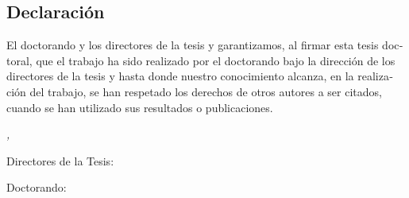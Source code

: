 \begin{otherlanguage}{spanish}
\chapter*{Declaración}

\thispagestyle{empty}
\bigskip
El doctorando \myName y los directores de la tesis \myProf y \myOtherProf garantizamos, al firmar esta tesis doctoral, que el trabajo ha sido realizado por el doctorando bajo la dirección de los directores de la tesis y hasta donde nuestro conocimiento alcanza, en la realización del trabajo, se han respetado los derechos de otros autores a ser citados, cuando se han utilizado sus resultados o publicaciones.  

\bigskip
\bigskip
\noindent\textit{\myLocation, \myTime}

\bigskip
\bigskip


\noindent\begin{minipage}[t]{0.45\textwidth}
\centering Directores de la Tesis: 

\bigskip
\bigskip
\bigskip
\bigskip

\myProf

\bigskip
\bigskip
\bigskip
\myOtherProf
\end{minipage} 
\hfill
\noindent\begin{minipage}[t]{0.45\textwidth}
\centering Doctorando: 

\bigskip
\bigskip
\bigskip
\bigskip

\myName
\end{minipage}

\end{otherlanguage}
